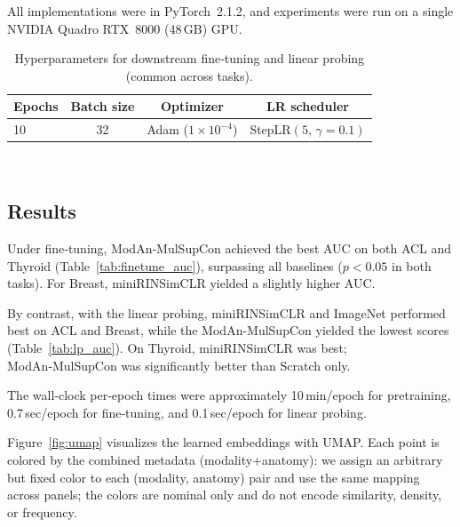 \documentclass[final,1p,times]{elsarticle}
\begin{document}
All implementations were in PyTorch~2.1.2, and experiments were run on a single NVIDIA Quadro RTX~8000 (48\,GB) GPU.



\begin{table}[t]
  \centering
  \caption{Hyperparameters for downstream fine‑tuning and linear probing (common across tasks).}
  \label{tab:downstream}
  \small
  \begin{tabular}{lccc}
    \toprule
    \textbf{Epochs} & \textbf{Batch size} & \textbf{Optimizer} & \textbf{LR scheduler} \\
    \midrule
    10 & 32 & Adam ($1{\times}10^{-4}$) & StepLR$(5,\,\gamma{=}0.1)$ \\
    \bottomrule
  \end{tabular}\\[2pt]
  \footnotesize
\end{table}

\subsection{Results}
\label{ssec:result}


Under fine‑tuning, ModAn‑MulSupCon achieved the best AUC on both ACL and Thyroid (Table~\ref{tab:finetune_auc}), surpassing all baselines ($p<0.05$ in both tasks).
For Breast, miniRINSimCLR yielded a slightly higher AUC.

By contrast, with the linear probing, miniRINSimCLR and ImageNet performed best on ACL and Breast, while the ModAn-MulSupCon yielded the lowest scores (Table~\ref{tab:lp_auc}).
On Thyroid, miniRINSimCLR was best; ModAn‑MulSupCon was significantly better than Scratch only.

The wall‑clock per‑epoch times were approximately 10\,min/epoch for pretraining, 0.7\,sec/epoch for fine‑tuning, and 0.1\,sec/epoch for linear probing.

Figure~\ref{fig:umap} visualizes the learned embeddings with UMAP.
Each point is colored by the combined metadata (modality+anatomy): we assign an arbitrary but fixed color to each (modality, anatomy) pair and use the same mapping across panels; the colors are nominal only and do not encode similarity, density, or frequency.
\end{document}
